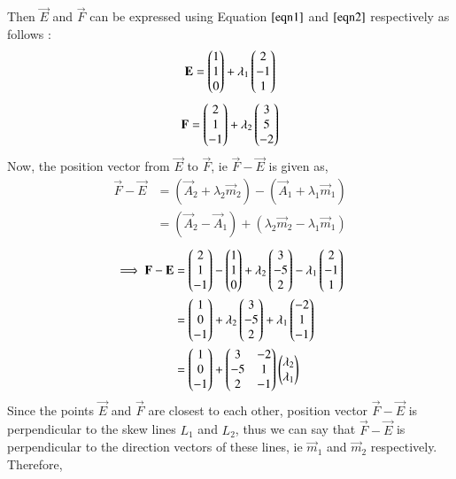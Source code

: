 \documentclass[journal,12pt,twocolumn]{IEEEtran}
\begin{document}
Then $\vec{E}$ and $\vec{F}$ can be expressed using Equation $\ref{eqn1}$ and $\ref{eqn2}$ respectively as follows :
\begin{align}
    \mathbf{E} = \begin{pmatrix}1 \\ 1 \\ 0\end{pmatrix} + \lambda_1\begin{pmatrix}2 \\ -1 \\ 1\end{pmatrix}
\end{align}
\begin{align}
    \mathbf{F} = \begin{pmatrix}2 \\ 1 \\ -1\end{pmatrix} + \lambda_2\begin{pmatrix}3 \\ 5 \\ -2\end{pmatrix}
\end{align}
Now, the position vector from $\vec{E}$ to $\vec{F}$, ie $\vec{F}-\vec{E}$ is given as,
\begin{align}
    \vec{F}-\vec{E} & = (\vec{A}_2 + \lambda_2\vec{m}_2) - (\vec{A}_1 + \lambda_1\vec{m}_1)\\& = (\vec{A}_2 - \vec{A}_1) + (\lambda_2\vec{m}_2 - \lambda_1\vec{m}_1)
\end{align}
\begin{align}
    \implies\mathbf{F}-\mathbf{E} & = \begin{pmatrix}2 \\ 1 \\ -1\end{pmatrix}-\begin{pmatrix}1 \\ 1 \\ 0\end{pmatrix} + \lambda_2\begin{pmatrix}3 \\ -5 \\ 2\end{pmatrix} -\lambda_1\begin{pmatrix}2\\-1\\1\end{pmatrix}\\&=\begin{pmatrix}1\\ 0 \\ -1\end{pmatrix}+ \lambda_2\begin{pmatrix}3 \\ -5 \\ 2\end{pmatrix} +\lambda_1\begin{pmatrix}-2\\1\\-1\end{pmatrix}\\& = \label{e4} \begin{pmatrix}1\\ 0 \\ -1\end{pmatrix}+\begin{pmatrix}3&-2\\-5&1\\2&-1\end{pmatrix}\begin{pmatrix}\lambda_2 \\ \lambda_1\end{pmatrix} 
\end{align}
Since the points $\vec{E}$ and $\vec{F}$ are closest to each other, position vector $\vec{F}-\vec{E}$ is perpendicular to the skew lines $L_1$ and $L_2$, thus we can say that $\vec{F}-\vec{E}$ is perpendicular to the direction vectors of these lines, ie $\vec{m}_1$ and $\vec{m}_2$ respectively. Therefore,
\end{document}
